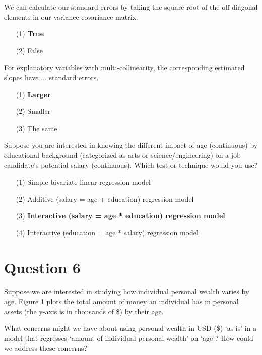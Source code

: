 \documentclass[12pt,letterpaper]{article}
\begin{document}
\vspace{.25cm}
\noindent We can calculate our standard errors by taking the square root of the off-diagonal elements
in our variance-covariance matrix.
\begin{enumerate}
	\item [(1)] \textbf{True}\
	\item [(2)] False
\end{enumerate}

\vspace{.25cm}
\noindent For explanatory variables with multi-collinearity, the corresponding estimated slopes have
... standard errors.
\begin{enumerate}
	\item [(1)] \textbf{Larger}\
	\item [(2)] Smaller
	\item [(3)] The same
\end{enumerate}

\vspace{.25cm}
\noindent Suppose you are interested in knowing the different impact of age (continuous) by educational
background (categorized as arts or science/engineering) on a job candidate’s potential salary
(continuous). Which test or technique would you use?
\begin{enumerate}
	
	\item [(1)] Simple bivariate linear regression model
	\item [(2)] Additive (salary = age + education) regression model
	\item [(3)] \textbf{Interactive (salary = age * education) regression model}\
	\item [(4)] Interactive (education = age * salary) regression model
	
\end{enumerate}

\newpage

\section*{Question 6}
\vspace{.25cm}
\noindent Suppose we are interested in studying how individual personal wealth varies by age. Figure
1 plots the total amount of money an individual has in personal assets (the y-axis is in
thousands of \$) by their age.

What concerns might we have about using personal wealth in USD (\$) ‘as is’ in a model
that regresses ‘amount of individual personal wealth’ on ‘age’? How could we address these
concerns?
\end{document}
